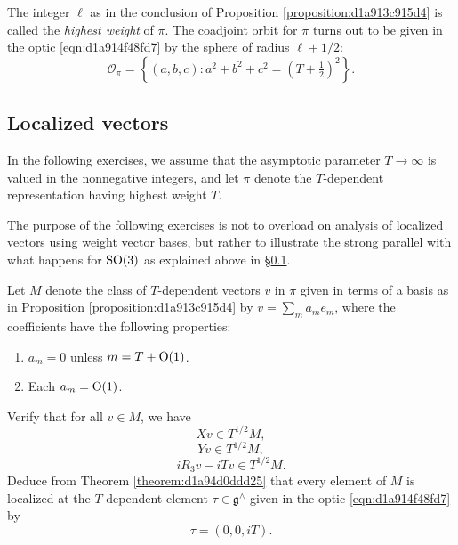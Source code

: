 \documentclass[reqno]{amsart} 
\numberwithin{equation}{section}
\begin{document}
The integer $\ell$ as in the conclusion of Proposition \ref{proposition:d1a913c915d4} is called the \emph{highest weight} of $\pi$.  The coadjoint orbit for $\pi$ turns out to be given in the optic \eqref{eqn:d1a914f48fd7} by the sphere of radius $\ell + 1/2$:
\begin{equation*}
  \mathcal{O}_\pi = \left\{ (a,b,c) : a^2 + b^2 + c^2 = (T + \tfrac{1}{2} )^2 \right\}.
\end{equation*}

\subsection{Localized vectors}\label{sec:d1a9162ebd8a}
In the following exercises, we assume that the asymptotic parameter $T \rightarrow \infty$ is valued in the nonnegative integers, and let $\pi$ denote the $T$-dependent representation having highest weight $T$.

\begin{remark}
  The purpose of the following exercises is not to overload on analysis of localized vectors using weight vector bases, but rather to illustrate the strong parallel with what happens for $\operatorname{SO}(3)$ as explained above in \S\ref{sec:d1a9162ebd8a}.
\end{remark}


\begin{exercise}\label{exercise:d1a913e1e9ec}
  Let $M$ denote the class of $T$-dependent vectors $v$ in $\pi$ given in terms of a basis as in Proposition \ref{proposition:d1a913c915d4} by $v = \sum_m a_m e_m$, where the coefficients have the following properties:
  \begin{enumerate}
  \item $a_m = 0$ unless $m = T + \operatorname{O}(1)$.
  \item Each $a_m = \operatorname{O}(1)$.
  \end{enumerate}
  Verify that for all $v \in M$, we have
  \begin{equation*}
    X v \in T^{1/2} M,
  \end{equation*}
  \begin{equation*}
    Y v \in T^{1/2} M,
  \end{equation*}
  \begin{equation*}
    i R_3 v - i T v \in T^{1/2} M.
  \end{equation*}
  Deduce from Theorem \ref{theorem:d1a94d0ddd25} that every element of $M$ is localized at the $T$-dependent element $\tau \in \mathfrak{g}^\wedge$ given in the optic \eqref{eqn:d1a914f48fd7} by
  \begin{equation*}
    \tau = (0,0,i T).
  \end{equation*}
\end{exercise}
\end{document}
